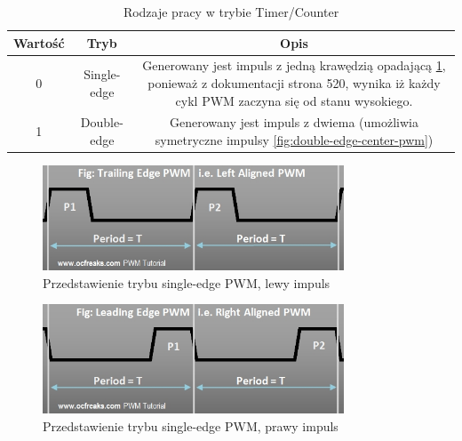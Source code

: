 \begin{enumerate}
\begin{enumerate}
\begin{enumerate}
\begin{enumerate}
\begin{table}[H]
\begin{tabular}{|c|c|c|}
                                \hline
                                Wartość & Tryb & Opis\\
                                \hline
                                    0 & Single-edge & Generowany jest impuls z jedną krawędzią  opadającą \ref{fig:single-edge-left-pwm}, ponieważ z dokumentacji strona 520, wynika iż każdy cykl PWM zaczyna się od stanu wysokiego.\\
                                    1 & Double-edge & Generowany jest impuls z dwiema (umożliwia symetryczne impulsy \ref{fig:double-edge-center-pwm})\\
                                \hline
                            \end{tabular}
                            \caption{Rodzaje pracy w trybie Timer/Counter}
                        \end{table}

                        \begin{figure}[H]
                            \centering
                            \includegraphics[width=0.8\textwidth]{../PWM/single_edge_left.jpg}
                            \caption{Przedstawienie trybu single-edge PWM, lewy impuls}
                            \label{fig:single-edge-left-pwm}
                        \end{figure}

                        \begin{figure}[H]
                            \centering
                            \includegraphics[width=0.8\textwidth]{../PWM/single_edge_right.jpg}
                            \caption{Przedstawienie trybu single-edge PWM, prawy impuls}
                            \label{fig:single-edge-right-pwm}
                        \end{figure}


\end{enumerate}
\end{enumerate}
\end{enumerate}
\end{enumerate}

